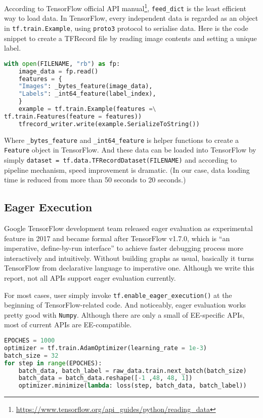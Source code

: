 According to TensorFlow official API manual\footnote{\url{https://www.tensorflow.org/api\_guides/python/reading\_data}}, \texttt{feed\_dict} is the least efficient way to load data.
In TensorFlow, every independent data is regarded as an object in \texttt{tf.train.Example}, using \texttt{proto3} protocol to serialise data.
Here is the code snippet to create a TFRecord file by reading image contents and setting a unique label.
\begin{lstlisting}[language = Python, caption = TFRecord File Creation]
with open(FILENAME, "rb") as fp:
	image_data = fp.read()
	features = {
	"Images": _bytes_feature(image_data),
	"Labels": _int64_feature(label_index),
	}
	example = tf.train.Example(features =\
tf.train.Features(feature = features))
	tfrecord_writer.write(example.SerializeToString())
\end{lstlisting}
Where \texttt{\_bytes\_feature} and \texttt{\_int64\_feature} is helper functions to create a \texttt{Feature} object in TensorFlow.
And these data can be loaded into TensorFlow by simply \texttt{dataset = tf.data.TFRecordDataset(FILENAME)} and according to pipeline mechanism, speed improvement is dramatic. (In our case, data loading time is reduced from more than 50 seconds to 20 seconds.)

\subsection{Eager Execution}
Google TensorFlow development team released eager evaluation as experimental feature in 2017 and became formal after TensorFlow v1.7.0, which is ``an imperative, define-by-run interface'' to achieve faster debugging process more interactively and intuitively. Without building graphs as usual, basically it turns TensorFlow from declarative language to imperative one. Although we write this report, not all APIs support eager evaluation currently.

For most cases, user simply invoke \texttt{tf.enable\_eager\_execution()} at the beginning of TensorFlow-related code. And noticeably, eager evaluation works pretty good with \texttt{Numpy}. Although there are only a small of EE-specific APIs, most of current APIs are EE-compatible.
\begin{lstlisting}[language = Python, caption = Rewritten CNN Core Code Using Eager Eexecution]
EPOCHES = 1000
optimizer = tf.train.AdamOptimizer(learning_rate = 1e-3)
batch_size = 32
for step in range(EPOCHES):
	batch_data, batch_label = raw_data.train.next_batch(batch_size)
	batch_data = batch_data.reshape([-1 ,48, 48, 1])
	optimizer.minimize(lambda: loss(step, batch_data, batch_label))
\end{lstlisting}

